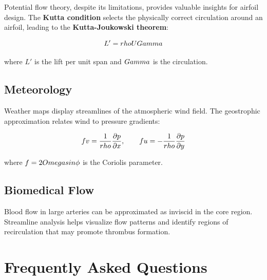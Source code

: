 Potential flow theory, despite its limitations, provides valuable insights for airfoil design. The \textbf{Kutta condition} selects the physically correct circulation around an airfoil, leading to the \textbf{Kutta-Joukowski theorem}:

\[
L' = \\rho U \\Gamma
\]

where $L'$ is the lift per unit span and $\\Gamma$ is the circulation.

\subsection{Meteorology}

Weather maps display streamlines of the atmospheric wind field. The geostrophic approximation relates wind to pressure gradients:

\[
f v = \frac{1}{\\rho}\frac{\partial p}{\partial x}, \qquad f u = -\frac{1}{\\rho}\frac{\partial p}{\partial y}
\]

where $f = 2\\Omega\\sin\phi$ is the Coriolis parameter.

\subsection{Biomedical Flow}

Blood flow in large arteries can be approximated as inviscid in the core region. Streamline analysis helps visualize flow patterns and identify regions of recirculation that may promote thrombus formation.

\section{Frequently Asked Questions}

